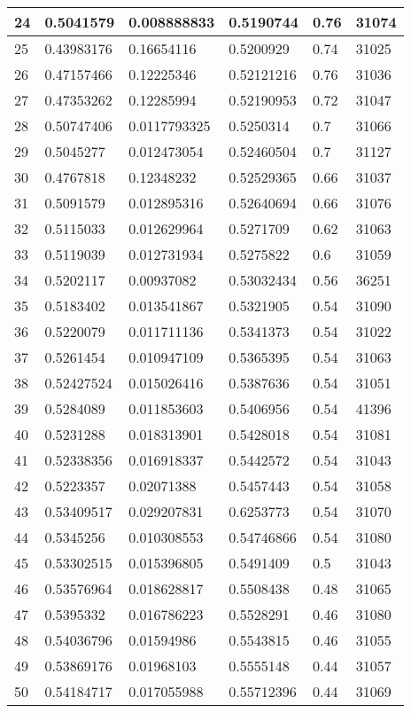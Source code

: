 \begin{longtable}{|l|l|l|l|l|l|}
24 & 0.5041579 & 0.008888833 & 0.5190744 & 0.76 & 31074 \\ \hline 
25 & 0.43983176 & 0.16654116 & 0.5200929 & 0.74 & 31025 \\ \hline 
26 & 0.47157466 & 0.12225346 & 0.52121216 & 0.76 & 31036 \\ \hline 
27 & 0.47353262 & 0.12285994 & 0.52190953 & 0.72 & 31047 \\ \hline 
28 & 0.50747406 & 0.0117793325 & 0.5250314 & 0.7 & 31066 \\ \hline 
29 & 0.5045277 & 0.012473054 & 0.52460504 & 0.7 & 31127 \\ \hline 
30 & 0.4767818 & 0.12348232 & 0.52529365 & 0.66 & 31037 \\ \hline 
31 & 0.5091579 & 0.012895316 & 0.52640694 & 0.66 & 31076 \\ \hline 
32 & 0.5115033 & 0.012629964 & 0.5271709 & 0.62 & 31063 \\ \hline 
33 & 0.5119039 & 0.012731934 & 0.5275822 & 0.6 & 31059 \\ \hline 
34 & 0.5202117 & 0.00937082 & 0.53032434 & 0.56 & 36251 \\ \hline 
35 & 0.5183402 & 0.013541867 & 0.5321905 & 0.54 & 31090 \\ \hline 
36 & 0.5220079 & 0.011711136 & 0.5341373 & 0.54 & 31022 \\ \hline 
37 & 0.5261454 & 0.010947109 & 0.5365395 & 0.54 & 31063 \\ \hline 
38 & 0.52427524 & 0.015026416 & 0.5387636 & 0.54 & 31051 \\ \hline 
39 & 0.5284089 & 0.011853603 & 0.5406956 & 0.54 & 41396 \\ \hline 
40 & 0.5231288 & 0.018313901 & 0.5428018 & 0.54 & 31081 \\ \hline 
41 & 0.52338356 & 0.016918337 & 0.5442572 & 0.54 & 31043 \\ \hline 
42 & 0.5223357 & 0.02071388 & 0.5457443 & 0.54 & 31058 \\ \hline 
43 & 0.53409517 & 0.029207831 & 0.6253773 & 0.54 & 31070 \\ \hline 
44 & 0.5345256 & 0.010308553 & 0.54746866 & 0.54 & 31080 \\ \hline 
45 & 0.53302515 & 0.015396805 & 0.5491409 & 0.5 & 31043 \\ \hline 
46 & 0.53576964 & 0.018628817 & 0.5508438 & 0.48 & 31065 \\ \hline 
47 & 0.5395332 & 0.016786223 & 0.5528291 & 0.46 & 31080 \\ \hline 
48 & 0.54036796 & 0.01594986 & 0.5543815 & 0.46 & 31055 \\ \hline 
49 & 0.53869176 & 0.01968103 & 0.5555148 & 0.44 & 31057 \\ \hline 
50 & 0.54184717 & 0.017055988 & 0.55712396 & 0.44 & 31069 \\ \hline 
\end{longtable}